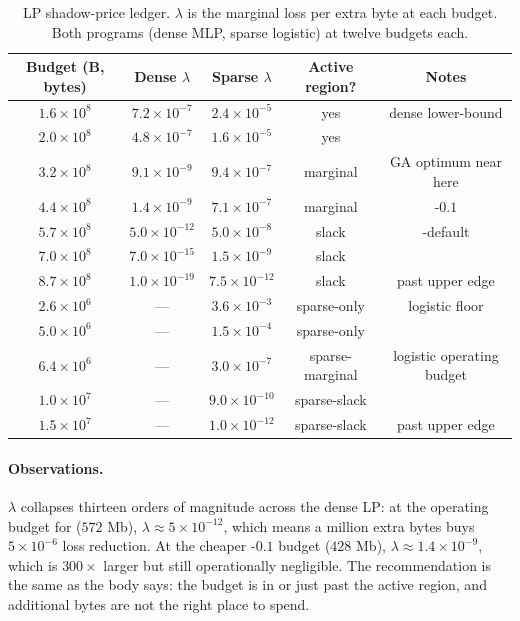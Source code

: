 \begin{table}[h]
\centering
\caption{LP shadow-price ledger. $\lambda$ is the marginal loss per
extra byte at each budget. Both programs (dense MLP, sparse
logistic) at twelve budgets each.}
\label{tab:lp-ledger}
\small
\begin{tabular}{c c c c c}
\toprule
Budget (B, bytes) & Dense $\lambda$ & Sparse $\lambda$ & Active region? & Notes \\
\midrule
$1.6\!\times\!10^{8}$ & $7.2\!\times\!10^{-7}$ & $2.4\!\times\!10^{-5}$ & yes & dense lower-bound \\
$2.0\!\times\!10^{8}$ & $4.8\!\times\!10^{-7}$ & $1.6\!\times\!10^{-5}$ & yes & \\
$3.2\!\times\!10^{8}$ & $9.1\!\times\!10^{-9}$ & $9.4\!\times\!10^{-7}$ & marginal & GA optimum near here \\
$4.4\!\times\!10^{8}$ & $1.4\!\times\!10^{-9}$ & $7.1\!\times\!10^{-7}$ & marginal & \fedprox{}-$0.1$ \\
$5.7\!\times\!10^{8}$ & $5.0\!\times\!10^{-12}$ & $5.0\!\times\!10^{-8}$ & slack & \fedavg{}-default \\
$7.0\!\times\!10^{8}$ & $7.0\!\times\!10^{-15}$ & $1.5\!\times\!10^{-9}$ & slack & \\
$8.7\!\times\!10^{8}$ & $1.0\!\times\!10^{-19}$ & $7.5\!\times\!10^{-12}$ & slack & past upper edge \\
$2.6\!\times\!10^{6}$ & --- & $3.6\!\times\!10^{-3}$ & sparse-only & logistic floor \\
$5.0\!\times\!10^{6}$ & --- & $1.5\!\times\!10^{-4}$ & sparse-only & \\
$6.4\!\times\!10^{6}$ & --- & $3.0\!\times\!10^{-7}$ & sparse-marginal & logistic operating budget \\
$1.0\!\times\!10^{7}$ & --- & $9.0\!\times\!10^{-10}$ & sparse-slack & \\
$1.5\!\times\!10^{7}$ & --- & $1.0\!\times\!10^{-12}$ & sparse-slack & past upper edge \\
\bottomrule
\end{tabular}
\end{table}

\paragraph{Observations.}
$\lambda$ collapses thirteen orders of magnitude across the dense
LP: at the operating budget for \fedavg{} ($572$ Mb), $\lambda
\!\approx\! 5\!\times\!10^{-12}$, which means a million extra bytes
buys $5\!\times\!10^{-6}$ loss reduction. At the cheaper
\fedprox{}-$0.1$ budget ($428$ Mb), $\lambda \!\approx\! 1.4\!\times\!
10^{-9}$, which is $300\!\times$ larger but still operationally
negligible. The recommendation is the same as the body says: the
budget is in or just past the active region, and additional bytes
are not the right place to spend.

